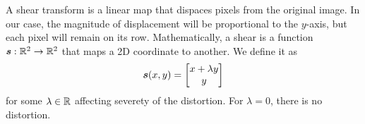 \documentclass[../main.tex]{subfiles}
\begin{document}
A shear transform is a linear map that dispaces pixels from the original image. 
In our case, the magnitude of displacement will be proportional to the $y$-axis, but each pixel will remain on its row.
Mathematically, a shear is a function ${\bm{s}} : \mathbb{R}^2 \to \mathbb{R}^2$ that maps a 2D coordinate to another.
We define it as
\begin{equation}
    {\bm{s}}(x,y) = \begin{bmatrix}
        x + \lambda y \\ y
    \end{bmatrix}
\end{equation}
for some $\lambda \in \mathbb{R}$ affecting severety of the distortion.
For $\lambda=0$, there is no distortion.
\begin{figure}
    \centering
    \begin{subfigure}[b]{0.47\textwidth}
\end{subfigure}
\end{figure}
\end{document}
